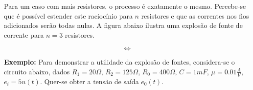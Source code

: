 \documentclass{article}
\numberwithin{equation}{section}
\newlength\Colsep
\begin{document}
Para um caso com mais resistores, o processo é exatamente o mesmo. Percebe-se que é possível estender este raciocínio para $n$ resistores e que as correntes nos fios adicionados serão todas nulas. A figura abaixo ilustra uma explosão de fonte de corrente para $n=3$ resistores.

\noindent\begin{minipage}{0.95\textwidth}
\begin{minipage}[c][3cm][c]{\dimexpr0.4\textwidth-0.5\Colsep\relax}
    \begin{center}
    \end{center}
\end{minipage} \hfill
\begin{minipage}[c][3cm][c]{\dimexpr0.1\textwidth-0.5\Colsep\relax}
    $$\iff$$
\end{minipage} \hfill
\begin{minipage}[c][3cm][c]{\dimexpr0.5\textwidth-0.5\Colsep\relax}
    \begin{center}
    \end{center}
\end{minipage}
\end{minipage}

\vspace{2mm}

\textbf{Exemplo:} Para demonstrar a utilidade da explosão de fontes, considera-se o circuito abaixo, dados $R_1=20 \Omega$, $R_2=125 \Omega$, $R_0=400 \Omega$, $C=1 mF$, $\mu = 0.01 \frac{A}{V}$, $e_i=5 u(t)$. Quer-se obter a tensão de saída $e_0(t)$.
\end{document}
